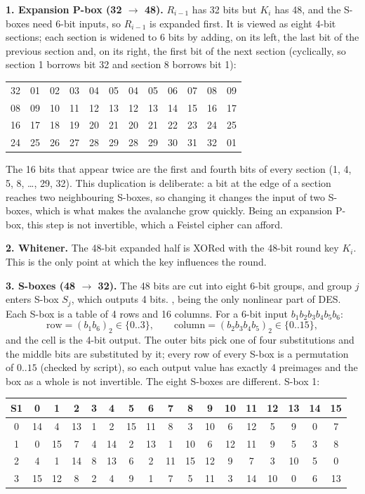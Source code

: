 \textbf{1. Expansion P-box (32 $\to$ 48).} $R_{i-1}$ has 32 bits but $K_i$ has 48, and the S-boxes need 6-bit inputs, so $R_{i-1}$ is expanded first. It is viewed as eight 4-bit sections; each section is widened to 6 bits by adding, on its left, the last bit of the previous section and, on its right, the first bit of the next section (cyclically, so section 1 borrows bit 32 and section 8 borrows bit 1):
\begin{center}\scriptsize\setlength{\tabcolsep}{3.2pt}
\begin{tabular}{@{}*{6}{c}@{\hspace{14pt}}*{6}{c}@{}}
32&01&02&03&04&05 & 04&05&06&07&08&09\\
08&09&10&11&12&13 & 12&13&14&15&16&17\\
16&17&18&19&20&21 & 20&21&22&23&24&25\\
24&25&26&27&28&29 & 28&29&30&31&32&01\\
\end{tabular}
\end{center}
The 16 bits that appear twice are the first and fourth bits of every section (1, 4, 5, 8, \dots, 29, 32). This duplication is deliberate: a bit at the edge of a section reaches two neighbouring S-boxes, so changing it changes the input of two S-boxes, which is what makes the avalanche grow quickly. Being an expansion P-box, this step is not invertible, which a Feistel cipher can afford.

\textbf{2. Whitener.} The 48-bit expanded half is XORed with the 48-bit round key $K_i$. This is the only point at which the key influences the round.

\textbf{3. S-boxes (48 $\to$ 32).} The 48 bits are cut into eight 6-bit groups, and group $j$ enters S-box $S_j$, which outputs 4 bits. , being the only nonlinear part of DES. Each S-box is a table of 4 rows and 16 columns. For a 6-bit input $b_1 b_2 b_3 b_4 b_5 b_6$:
\[
\text{row} = (b_1 b_6)_2 \in \{0..3\}, \qquad \text{column} = (b_2 b_3 b_4 b_5)_2 \in \{0..15\},
\]
and the cell is the 4-bit output. The outer bits pick one of four substitutions and the middle bits are substituted by it; every row of every S-box is a permutation of $0..15$ (checked by script), so each output value has exactly 4 preimages and the box as a whole is not invertible. The eight S-boxes are different. S-box 1:
\begin{center}\small\setlength{\tabcolsep}{3.5pt}
\begin{tabular}{@{}c|*{16}{c}@{}}
S1 & 0&1&2&3&4&5&6&7&8&9&10&11&12&13&14&15\\ \midrule
0 & 14&4&13&1&2&15&11&8&3&10&6&12&5&9&0&7\\
1 & 0&15&7&4&14&2&13&1&10&6&12&11&9&5&3&8\\
2 & 4&1&14&8&13&6&2&11&15&12&9&7&3&10&5&0\\
3 & 15&12&8&2&4&9&1&7&5&11&3&14&10&0&6&13\\
\end{tabular}
\end{center}

